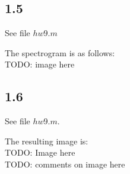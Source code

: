 \documentclass[12pt]{article}
\begin{document}
\subsection*{1.5}
See file $hw9.m$

The spectrogram is as follows:\\

TODO: image here

\subsection*{1.6}
See file $hw9.m$.

The resulting image is:\\
TODO: Image here\\

TODO: comments on image here
\end{document}
